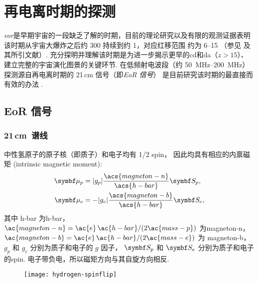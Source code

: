 

\chapter{再电离时期的探测}
\label{chap:detection}


\emph{\acf{eor}}是早期宇宙的一段缺乏了解的时期，目前的理论研究以及有限的观测证据表明
该时期从宇宙大爆炸之后约 \SI{300}{\Myr} 持续到约 \SI{1}{\Gyr}，对应红移范围
约为 \numrange{6}{15} （参见  及其所引文献）.
充分探明并理解该时期是为进一步揭示更早的\ac{cd}和\ac{da}（$z > 15$）、
建立完整的宇宙演化图景的关键环节.
在低频射电波段（约 \SIrange{50}{200}{\MHz}）
探测源自再电离时期的 21\,cm 信号（即\emph{EoR 信号}）
是目前研究该时期的最直接而有效的办法 \cite{madau1997,tozzi2000,furlanetto2006}.


\section{EoR 信号}
\label{sec:eor-signal}

\subsection{21\texorpdfstring{\,}{ }cm~谱线}
\label{sec:21cm-line}

中性氢原子的原子核（即质子）和电子均有 1/2 \ac{spin}，
因此均具有相应的内禀磁矩 (intrinsic magnetic moment):
\begin{align}
  \B{\mu}_p & = |g_p| \frac{\acs{magneton-n}}{\acs{h-bar}} \B{S}_p , \\
  \B{\mu}_e & = - |g_e| \frac{\acs{magneton-b}}{\acs{h-bar}} \B{S}_e ,
\end{align}
其中
\ac{h-bar} 为\acl{h-bar}，
$\ac{magneton-n} = \ac{e}\,\ac{h-bar} / (2 \ac{mass-p})$ 为\acl{magneton-n}，
$\ac{magneton-b} = \ac{e}\,\ac{h-bar} / (2 \ac{mass-e})$ 为 \acl{magneton-b}，
$g_p$ 和 $g_e$ 分别为质子和电子的 $g$ 因子，
$\B{S}_p$ 和 $\B{S}_e$ 分别为质子和电子的\ac{spin}.
电子带负电，所以磁矩方向与其自旋方向相反.

\begin{figure}[htp]
  \centering
  \texttt{[image: hydrogen-spinflip]}
  \label{fig:hi-spinflip}
\end{figure}

